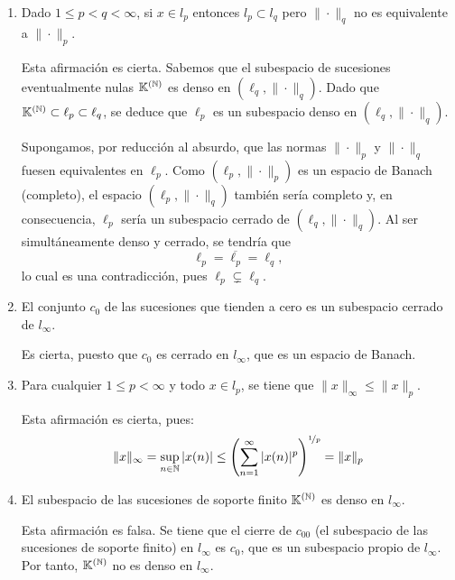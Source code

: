 \documentclass[12pt]{article}
\begin{document}
\begin{ejercicio}~
    \begin{enumerate}[label=(\alph*)]
        \item Dado $1\leq p < q < \infty$, si $x\in l_p$ entonces $l_p\subset l_q$ pero $\|\cdot \|_q$ no es equivalente a $\|\cdot\|_p$.
        
        Esta afirmación es cierta. Sabemos que el subespacio de sucesiones eventualmente nulas $\mathbb{K}^{( \mathbb{N} )}$ es denso en $(\ell_q, \|\cdot\|_q)$. Dado que $\mathbb{K}^{( \mathbb{N} )} \subset \ell_p \subset \ell_q$, se deduce que $\ell_p$ es un subespacio denso en $(\ell_q, \|\cdot\|_q)$.

        Supongamos, por reducción al absurdo, que las normas $\|\cdot\|_p$ y $\|\cdot\|_q$ fuesen equivalentes en $\ell_p$. Como $(\ell_p, \|\cdot\|_p)$ es un espacio de Banach (completo), el espacio $(\ell_p, \|\cdot\|_q)$ también sería completo y, en consecuencia, $\ell_p$ sería un subespacio cerrado de $(\ell_q, \|\cdot\|_q)$. Al ser simultáneamente denso y cerrado, se tendría que
        \begin{equation*}
            \ell_p = \overline{\ell_p} = \ell_q,
        \end{equation*}
        lo cual es una contradicción, pues $\ell_p \subsetneq \ell_q$.
        \item El conjunto $c_0$ de las sucesiones que tienden a cero es un subespacio cerrado de $l_\infty$.
        
        Es cierta, puesto que $c_0$ es cerrado en $l_\infty$, que es un espacio de Banach.
        \item Para cualquier $1\leq p < \infty$ y todo $x\in l_p$, se tiene que $\|x\|_\infty \leq \|x\|_p$.
        
        Esta afirmación es cierta, pues:
        \begin{align*}
            \|x\|_\infty = \sup_{n\in \mathbb{N}} |x(n)| \leq \left(\sum_{n=1}^{\infty} |x(n)|^p\right)^{\nicefrac{1}{p}} = \|x\|_p
        \end{align*}
        \item El subespacio de las sucesiones de soporte finito $\mathbb{K}^{(\mathbb{N})}$ es denso en $l_\infty$.
        
        Esta afirmación es falsa. Se tiene que el cierre de $c_{00}$ (el subespacio de las sucesiones de soporte finito) en $l_\infty$ es $c_0$, que es un subespacio propio de $l_\infty$. Por tanto, $\mathbb{K}^{(\mathbb{N})}$ no es denso en $l_\infty$.
    \end{enumerate}
    
\end{ejercicio}
\end{document}

